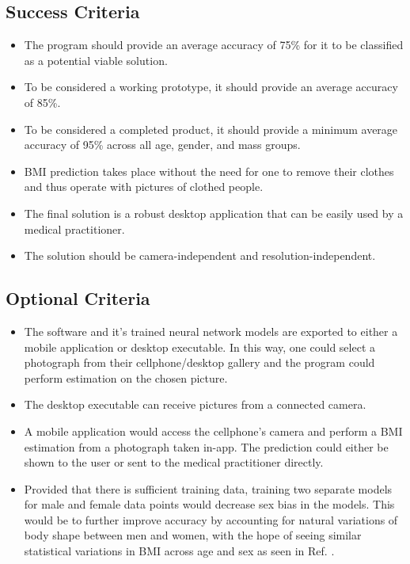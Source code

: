 \documentclass[conference]{IEEEtran}
\begin{document}
\subsection{Success Criteria}
\begin{itemize}
	\item The program should provide an average accuracy of 75\% for it to be classified as a potential viable solution.
	\item To be considered a working prototype, it should provide an average accuracy of 85\%.
	\item To be considered a completed product, it should provide a minimum average accuracy of 95\% across all age, gender, and mass groups.
	\item BMI prediction takes place without the need for one to remove their clothes and thus operate with pictures of clothed people.
	\item The final solution is a robust desktop application that can be easily used by a medical practitioner.
	\item The solution should be camera-independent and resolution-independent.
\end{itemize}

\subsection{Optional Criteria}
\begin{itemize}
	\item The software and it's trained neural network models are exported to either a mobile application or desktop executable. In this way, one could select a photograph from their cellphone/desktop gallery and the program could perform estimation on the chosen picture.
	\item The desktop executable can receive pictures from a connected camera.
	\item A mobile application would access the cellphone's camera and perform a BMI estimation from a photograph taken in-app. The prediction could either be shown to the user or sent to the medical practitioner directly.
	\item Provided that there is sufficient training data, training two separate models for male and female data points would decrease sex bias in the models. This would be to further improve accuracy by accounting for natural variations of body shape between men and women, with the hope of seeing similar statistical variations in BMI across age and sex as seen in Ref. \cite{bmiage}.
\end{itemize}
\end{document}
